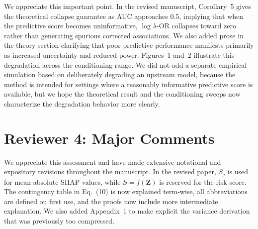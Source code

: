 \documentclass[onecolumn,11pt]{IEEEtran}
\begin{document}
We appreciate this important point. In the revised manuscript, Corollary~5 gives the theoretical collapse guarantee as AUC approaches $0.5$, implying that when the predictive score becomes uninformative, $\log \lambda$-OR collapses toward zero rather than generating spurious corrected associations. We also added prose in the theory section clarifying that poor predictive performance manifests primarily as increased uncertainty and reduced power. Figures~1 and~2 illustrate this degradation across the conditioning range. We did not add a separate empirical simulation based on deliberately degrading an upstream model, because the method is intended for settings where a reasonably informative predictive score is available, but we hope the theoretical result and the conditioning sweeps now characterize the degradation behavior more clearly.
























\section*{Reviewer 4: Major Comments}


We appreciate this assessment and have made extensive notational and expository revisions throughout the manuscript. In the revised paper, $S_j$ is used for mean-absolute SHAP values, while $S=f(\mathbf{Z})$ is reserved for the risk score. The contingency table in Eq.~(10) is now explained term-wise, all abbreviations are defined on first use, and the proofs now include more intermediate explanation. We also added Appendix~1 to  make explicit the variance derivation that was previously too compressed.
\end{document}
